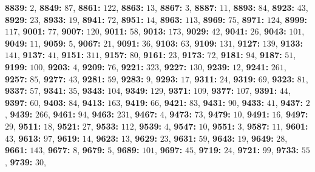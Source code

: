 \textsf{\bfseries 8839:} $2$, \textsf{\bfseries 8849:} $87$, \textsf{\bfseries 8861:} $122$, \textsf{\bfseries 8863:} $13$, \textsf{\bfseries 8867:} $3$, \textsf{\bfseries 8887:} $11$, \textsf{\bfseries 8893:} $84$, \textsf{\bfseries 8923:} $43$, \textsf{\bfseries 8929:} $23$, \textsf{\bfseries 8933:} $19$, \textsf{\bfseries 8941:} $72$, \textsf{\bfseries 8951:} $14$, \textsf{\bfseries 8963:} $113$, \textsf{\bfseries 8969:} $75$, \textsf{\bfseries 8971:} $124$, \textsf{\bfseries 8999:} $117$, \textsf{\bfseries 9001:} $77$, \textsf{\bfseries 9007:} $120$, \textsf{\bfseries 9011:} $58$, \textsf{\bfseries 9013:} $173$, \textsf{\bfseries 9029:} $42$, \textsf{\bfseries 9041:} $26$, \textsf{\bfseries 9043:} $101$, \textsf{\bfseries 9049:} $11$, \textsf{\bfseries 9059:} $5$, \textsf{\bfseries 9067:} $21$, \textsf{\bfseries 9091:} $36$, \textsf{\bfseries 9103:} $63$, \textsf{\bfseries 9109:} $131$, \textsf{\bfseries 9127:} $139$, \textsf{\bfseries 9133:} $141$, \textsf{\bfseries 9137:} $41$, \textsf{\bfseries 9151:} $311$, \textsf{\bfseries 9157:} $80$, \textsf{\bfseries 9161:} $23$, \textsf{\bfseries 9173:} $72$, \textsf{\bfseries 9181:} $94$, \textsf{\bfseries 9187:} $51$, \textsf{\bfseries 9199:} $100$, \textsf{\bfseries 9203:} $4$, \textsf{\bfseries 9209:} $76$, \textsf{\bfseries 9221:} $323$, \textsf{\bfseries 9227:} $130$, \textsf{\bfseries 9239:} $12$, \textsf{\bfseries 9241:} $261$, \textsf{\bfseries 9257:} $85$, \textsf{\bfseries 9277:} $43$, \textsf{\bfseries 9281:} $59$, \textsf{\bfseries 9283:} $9$, \textsf{\bfseries 9293:} $17$, \textsf{\bfseries 9311:} $24$, \textsf{\bfseries 9319:} $69$, \textsf{\bfseries 9323:} $81$, \textsf{\bfseries 9337:} $57$, \textsf{\bfseries 9341:} $35$, \textsf{\bfseries 9343:} $104$, \textsf{\bfseries 9349:} $129$, \textsf{\bfseries 9371:} $109$, \textsf{\bfseries 9377:} $107$, \textsf{\bfseries 9391:} $44$, \textsf{\bfseries 9397:} $60$, \textsf{\bfseries 9403:} $84$, \textsf{\bfseries 9413:} $163$, \textsf{\bfseries 9419:} $66$, \textsf{\bfseries 9421:} $83$, \textsf{\bfseries 9431:} $90$, \textsf{\bfseries 9433:} $41$, \textsf{\bfseries 9437:} $2$, \textsf{\bfseries 9439:} $266$, \textsf{\bfseries 9461:} $94$, \textsf{\bfseries 9463:} $231$, \textsf{\bfseries 9467:} $4$, \textsf{\bfseries 9473:} $73$, \textsf{\bfseries 9479:} $10$, \textsf{\bfseries 9491:} $16$, \textsf{\bfseries 9497:} $29$, \textsf{\bfseries 9511:} $18$, \textsf{\bfseries 9521:} $27$, \textsf{\bfseries 9533:} $112$, \textsf{\bfseries 9539:} $4$, \textsf{\bfseries 9547:} $10$, \textsf{\bfseries 9551:} $3$, \textsf{\bfseries 9587:} $11$, \textsf{\bfseries 9601:} $43$, \textsf{\bfseries 9613:} $97$, \textsf{\bfseries 9619:} $14$, \textsf{\bfseries 9623:} $13$, \textsf{\bfseries 9629:} $23$, \textsf{\bfseries 9631:} $59$, \textsf{\bfseries 9643:} $19$, \textsf{\bfseries 9649:} $28$, \textsf{\bfseries 9661:} $143$, \textsf{\bfseries 9677:} $8$, \textsf{\bfseries 9679:} $5$, \textsf{\bfseries 9689:} $101$, \textsf{\bfseries 9697:} $45$, \textsf{\bfseries 9719:} $24$, \textsf{\bfseries 9721:} $99$, \textsf{\bfseries 9733:} $55$, \textsf{\bfseries 9739:} $30$, 

